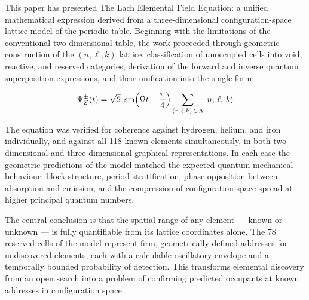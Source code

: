 \documentclass[12pt, a4paper]{article}
\newcommand{\Lattice}{\Lambda}           %
\newcommand{\Psipm}{\Psi_{Z}^{\pm}}     %
\begin{document}
This paper has presented The Lach Elemental Field Equation: a unified mathematical
expression derived from a three-dimensional configuration-space lattice model of the
periodic table. Beginning with the limitations of the conventional two-dimensional table, the
work proceeded through geometric construction of the $(n, \ell, k)$ lattice, classification of
unoccupied cells into void, reactive, and reserved categories, derivation of the forward and
inverse quantum superposition expressions, and their unification into the single form:

\begin{equation*}
  \Psipm(t) = \sqrt{2}\;\sin\!\left(\Omega t + \frac{\pi}{4}\right)
  \sum_{(n,\ell,k)\,\in\,\Lattice} \ket{n,\, \ell,\, k}
\end{equation*}

The equation was verified for coherence against hydrogen, helium, and iron individually,
and against all 118 known elements simultaneously, in both two-dimensional and
three-dimensional graphical representations. In each case the geometric predictions of the
model matched the expected quantum-mechanical behaviour: block structure, period
stratification, phase opposition between absorption and emission, and the compression of
configuration-space spread at higher principal quantum numbers.

The central conclusion is that the spatial range of any element --- known or unknown ---
is fully quantifiable from its lattice coordinates alone. The 78 reserved cells of the model
represent firm, geometrically defined addresses for undiscovered elements, each with a
calculable oscillatory envelope and a temporally bounded probability of detection. This
transforms elemental discovery from an open search into a problem of confirming predicted
occupants at known addresses in configuration space.
\end{document}
